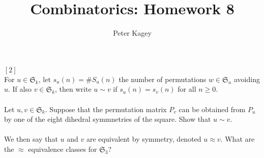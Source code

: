 \documentclass{article}
\newenvironment{problem}[2][Problem]{\begin{trivlist}
\item[\hskip \labelsep {\bfseries #1}\hskip \labelsep {\bfseries #2.}]}{\end{trivlist}}
\begin{document}
\title{Combinatorics: Homework 8}
\author{Peter Kagey}

\maketitle

\begin{problem}{1: 58 (a)} $[2]$ \\
  For $u \in \mathfrak S_k$, let $s_u(n) = \#S_u(n)$ the number of permutations
  $w \in \mathfrak S_n$ avoiding $u$. If also $v \in \mathfrak S_k$, then write
  $u \sim v$ if $s_u(n) = s_v(n)$ for all $n \geq 0$.
  \\~\\
  Let $u, v \in \mathfrak S_k$. Suppose that the permutation matrix $P_v$ can
  be obtained from $P_u$ by one of the eight dihedral symmnetries of the square.
  Show that $u \sim v$.
  \\~\\
  We then say that $u$ and $v$ are equivalent by symmetry, denoted
  $u \approx v$. What are the $\approx$ equivalence classes for $\mathfrak S_3$?
\end{problem}
\end{document}
